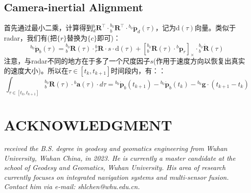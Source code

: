 \documentclass[12pt, onecolumn]{article}
\newcommand\liehat[1]{\left[ #1 \right]_\times}
\newcommand\bsm[1]{\boldsymbol{\mathrm{#1}}}
\begin{document}
	\subsection{Camera-inertial Alignment}
	首先通过最小二乘，计算得到${^{b}_{d}\boldsymbol{R}^\top}\cdot{^{b_0}_{b}\boldsymbol{R}^\top}\cdot{^{b_0}\dot{\boldsymbol{p}}_d(\tau)}$，记为$\bsm{d}(\tau)$向量。类似于radar，我们有(把$\{r\}$替换为$\{c\}$即可)：
	\begin{equation}
	{^{b_0}\dot{\boldsymbol{p}}_b(\tau)}={^{b_0}_{b}\boldsymbol{R}}(\tau)\cdot{^{b}_{r}\boldsymbol{R}}\cdot s\cdot\bsm{d}(\tau)
	+\liehat{{^{b_0}_{b}\boldsymbol{R}(\tau)}\cdot{^{b}{\boldsymbol{p}}_r}}\cdot{^{b_0}_{b}\dot{\boldsymbol{R}}(\tau)}
	\end{equation}
	注意，与radar不同的地方在于多了一个尺度因子$s$(作用于速度方向以恢复出真实的速度大小)。所以在$\tau\in[t_k,t_{k+1}]$时间段内，有：：
	\begin{equation}
	\int_{\tau\in[t_k,t_{k+1}]}{^{b_0}_{b}\boldsymbol{R}(\tau)}\cdot{^{b}\boldsymbol{a}(\tau)}\cdot d\tau=
	{^{b_0}\dot{\boldsymbol{p}}_b(t_{k+1})}-{^{b_0}\dot{\boldsymbol{p}}_b(t_k)}
	-{^{b_0}\boldsymbol{g}}\cdot (t_{k+1}-t_k)
	\end{equation}
	
	
	
	\newpage
	
	
		
	\newpage
	\section*{ACKNOWLEDGMENT}
	\begin{tcolorbox}[colback=white,colframe=white!70!black,title={\bfseries Author Information}]
	\par\noindent
		\parbox[t]{\linewidth}{
	 \noindent{}
	 \emph{
	 received the B.S. degree in geodesy and geomatics engineering from Wuhan University, Wuhan China, in 2023.
	 He is currently a master candidate at the school of Geodesy and Geomatics, Wuhan University. His area of research currently focuses on integrated navigation systems and multi-sensor fusion.
	 Contact him via e-mail: shlchen@whu.edu.cn.
	 }}
	\end{tcolorbox}
		
		
\end{document}

